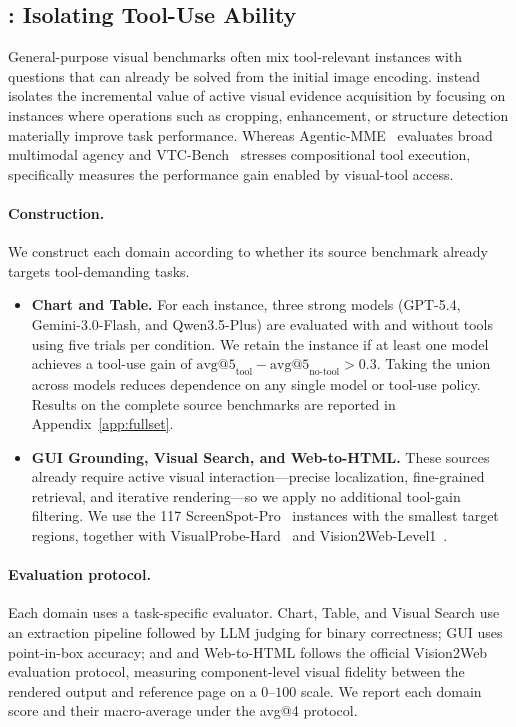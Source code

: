 \subsection{\benchname: Isolating Tool-Use Ability}
\label{sec:bench}

General-purpose visual benchmarks often mix tool-relevant instances with questions that can already be solved from the initial image encoding. \benchname instead isolates the incremental value of active visual evidence acquisition by focusing on instances where operations such as cropping, enhancement, or structure detection materially improve task performance. Whereas Agentic-MME~\citep{wei2026agentic} evaluates broad multimodal agency and VTC-Bench~\citep{zhu2026vtc} stresses compositional tool execution, \benchname specifically measures the performance gain enabled by visual-tool access.

\paragraph{Construction.}
We construct each domain according to whether its source benchmark already targets tool-demanding tasks.

\begin{itemize}

\item \textbf{Chart and Table.}
For each instance, three strong models (GPT-5.4, Gemini-3.0-Flash, and Qwen3.5-Plus) are evaluated with and without tools using five trials per condition. We retain the instance if at least one model achieves a tool-use gain of $\mathrm{avg@5}_{\mathrm{tool}}-\mathrm{avg@5}_{\mathrm{no\text{-}tool}}>0.3$.
Taking the union across models reduces dependence on any single model or tool-use policy. Results on the complete source benchmarks are reported in Appendix~\ref{app:fullset}.

\item \textbf{GUI Grounding, Visual Search, and Web-to-HTML.}
These sources already require active visual interaction---precise localization, fine-grained retrieval, and iterative rendering---so we apply no additional tool-gain filtering. We use the 117 ScreenSpot-Pro~\citep{li2025screenspotpro} instances with the smallest target regions, together with VisualProbe-Hard~\citep{lai2026minio3} and Vision2Web-Level1~\citep{he2026vision2web}.

\end{itemize}

\paragraph{Evaluation protocol.}
Each domain uses a task-specific evaluator. Chart, Table, and Visual Search use an extraction pipeline followed by LLM judging for binary correctness; GUI uses point-in-box accuracy; and and Web-to-HTML follows the official Vision2Web evaluation protocol, measuring component-level visual fidelity between the rendered output and reference page on a $0$--$100$ scale. We report each domain score and their macro-average under the avg@4 protocol.
